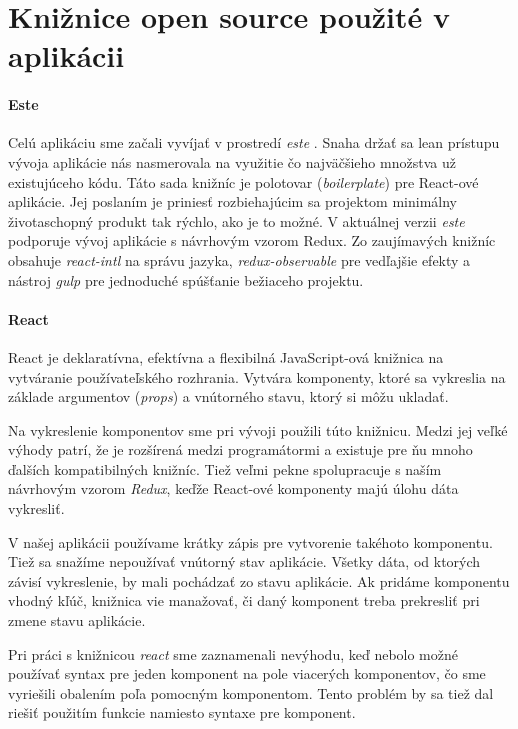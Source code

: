 \section{Knižnice open source použité v aplikácii}%

\label{sec:kniznice}

\paragraph{Este}
Celú aplikáciu sme začali vyvíjať v prostredí \emph{este} \cite{Este}. Snaha držať sa lean prístupu vývoja aplikácie nás nasmerovala na využitie čo najväčšieho množstva už existujúceho kódu. Táto sada knižníc je polotovar (\emph{boilerplate}) pre React-ové aplikácie. 
Jej poslaním je priniesť rozbiehajúcim sa projektom minimálny životaschopný produkt tak rýchlo, ako je to možné. V aktuálnej verzii \emph{este} podporuje vývoj aplikácie s návrhovým vzorom Redux. Zo zaujímavých knižníc obsahuje \emph{react-intl} na správu jazyka, \emph{redux-observable} pre vedľajšie efekty a nástroj \emph{gulp} pre jednoduché spúšťanie bežiaceho projektu.

\paragraph{React}
React \cite{react} je deklaratívna, efektívna a flexibilná JavaScript-ová knižnica na vytváranie používateľského rozhrania. Vytvára komponenty, ktoré sa vykreslia na základe argumentov (\emph{props}) a vnútorného stavu, ktorý si môžu ukladať. 

Na vykreslenie komponentov sme pri vývoji použili túto knižnicu. Medzi jej veľké výhody patrí, že je rozšírená medzi programátormi a existuje pre ňu mnoho ďalších kompatibilných knižníc. Tiež veľmi pekne spolupracuje s naším návrhovým vzorom \emph{Redux}, keďže React-ové komponenty majú úlohu dáta vykresliť.

V našej aplikácii používame krátky zápis pre vytvorenie takéhoto komponentu. Tiež sa snažíme nepoužívať vnútorný stav aplikácie. Všetky dáta, od ktorých závisí vykreslenie, by mali pochádzať zo stavu aplikácie. Ak pridáme komponentu vhodný kľúč, knižnica vie manažovať, či daný komponent treba prekresliť pri zmene stavu aplikácie.

Pri práci s knižnicou \emph{react} sme zaznamenali nevýhodu, keď nebolo možné používať syntax pre jeden komponent na pole viacerých komponentov, čo sme vyriešili obalením poľa pomocným komponentom. Tento problém by sa tiež dal riešiť použitím funkcie namiesto syntaxe pre komponent.

